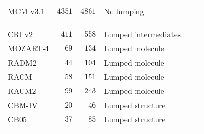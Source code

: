 \documentclass[acpd, online, hvmath]{copernicus}
\providecommand{\DIFaddendFL}{} %
\begin{document}
\begin{table}[t]
{\begin{tabular}{lrrlll}
        {MCM v3.1} &{$4351$} &{$4861$} &{No lumping} &\citet{Jenkin:1997} & \\
        &&&&\citet{Saunders:2003} & \\
        &&&&\citet{Jenkin:2003} & \\
        &&&&\citet{Bloss:2005} & \\
        CRI v2 &$411$ &$558$ &Lumped intermediates &\citet{Jenkin:2008} &\citet{Derwent:2015} \\
        MOZART-4 &$69$ &$134$ &Lumped molecule &\citet{Emmons:2010} &\citet{Hou:2015}\\
        RADM2 &$44$ &$104$ &Lumped molecule &\citet{Stockwell:1990} &\citet{Li:2014}\\
        RACM &$58$ &$151$ &Lumped molecule &\citet{Stockwell:1997} &\citet{Ahmadov:2015}\\
        RACM2 &$99$ &$243$ &Lumped molecule &\citet{Goliff:2013} &\citet{Goliff:2015}\\
        CBM-IV &$20$ &$46$ &Lumped structure &\citet{Gery:1989} &\citet{Foster:2014}\\
        CB05 &$37$ &$85$ &Lumped structure &\citet{Yarwood:2005} &\citet{Dunker:2015}\\
        \bottomhline
    \end{tabular}}
\DIFaddendFL \label{t:mechanisms}
\end{table}
\end{document}
